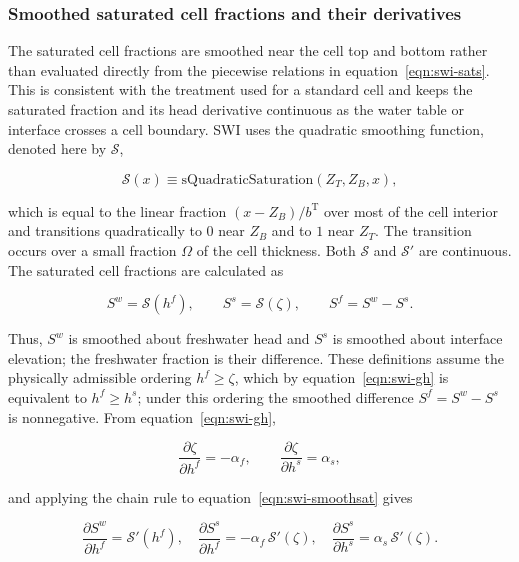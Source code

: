 \subsubsection{Smoothed saturated cell fractions and their derivatives}
\label{sec:swi-smoothsat}

The saturated cell fractions are smoothed near the cell top and bottom rather than evaluated directly from the piecewise relations in equation~\ref{eqn:swi-sats}. This is consistent with the treatment used for a standard \mf cell and keeps the saturated fraction and its head derivative continuous as the water table or interface crosses a cell boundary. SWI uses the \mf quadratic smoothing function, denoted here by $\mathcal{S}$,

\begin{equation}
\label{eqn:swi-smoothop}
\mathcal{S}(x)\equiv \mathrm{sQuadraticSaturation}(Z_{T},Z_{B},x),
\end{equation}

\noindent which is equal to the linear fraction $(x-Z_{B})/b^{\mathrm{T}}$ over most of the cell interior and transitions quadratically to $0$ near $Z_{B}$ and to $1$ near $Z_{T}$. The transition occurs over a small fraction $\Omega$ of the cell thickness. Both $\mathcal{S}$ and $\mathcal{S}'$ are continuous. The saturated cell fractions are calculated as

\begin{equation}
\label{eqn:swi-smoothsat}
S^{w}=\mathcal{S}(h^{f}),\qquad
S^{s}=\mathcal{S}(\zeta),\qquad
S^{f}=S^{w}-S^{s}.
\end{equation}

\noindent Thus, $S^{w}$ is smoothed about freshwater head and $S^{s}$ is smoothed about interface elevation; the freshwater fraction is their difference. These definitions assume the physically admissible ordering $h^{f}\ge\zeta$, which by equation~\ref{eqn:swi-gh} is equivalent to $h^{f}\ge h^{s}$; under this ordering the smoothed difference $S^{f}=S^{w}-S^{s}$ is nonnegative. From equation~\ref{eqn:swi-gh},

\begin{equation}
\label{eqn:swi-dzeta}
\frac{\partial\zeta}{\partial h^{f}}=-\alpha_{f},
\qquad
\frac{\partial\zeta}{\partial h^{s}}=\alpha_{s},
\end{equation}

\noindent and applying the chain rule to equation~\ref{eqn:swi-smoothsat} gives

\begin{equation}
\label{eqn:swi-dsat}
\frac{\partial S^{w}}{\partial h^{f}}=\mathcal{S}'(h^{f}),\quad
\frac{\partial S^{s}}{\partial h^{f}}=-\alpha_{f}\,\mathcal{S}'(\zeta),\quad
\frac{\partial S^{s}}{\partial h^{s}}=\alpha_{s}\,\mathcal{S}'(\zeta).
\end{equation}

